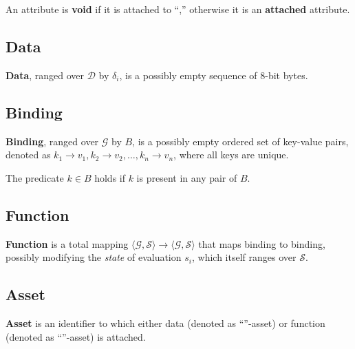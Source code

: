 \begin{definition}
An attribute is \textbf{void} if it is attached to ``\stx{\varnothing},''
  otherwise it is an \textbf{attached} attribute.
\end{definition}

\subsection{Data}\label{sec:data}

\begin{definition}[Data]
\textbf{Data}, ranged over \(\mathcal{D}\) by \(\delta_i\), is a possibly empty sequence of 8-bit bytes.
\end{definition}

\subsection{Binding}\label{sec:binding}

\begin{definition}[Binding]
\textbf{Binding}, ranged over \(\mathcal{G}\) by \(B\), is a possibly empty
  ordered set of key-value pairs, denoted as
  \( k_1 \to v_1, k_2 \to v_2, \dots, k_n \to v_n \), where all keys are unique.
\end{definition}

The predicate \(k \in B\) holds if \(k\) is present in any pair of \(B\).

\subsection{Function}\label{sec:function}

\begin{definition}[Function]
\textbf{Function} is a total mapping
\(\langle \mathcal{G}, \mathcal{S} \rangle \to \langle \mathcal{G}, \mathcal{S} \rangle\)
  that maps binding to binding, possibly modifying the \emph{state} of evaluation \(s_i\),
  which itself ranges over \(\mathcal{S}\).
\end{definition}

\subsection{Asset}\label{sec:asset}

\begin{definition}[Asset]
\textbf{Asset} is an identifier to which either data
(denoted as ``\stx{\Delta}''-asset) or function
(denoted as ``\stx{\lambda}''-asset) is attached.
\end{definition}

